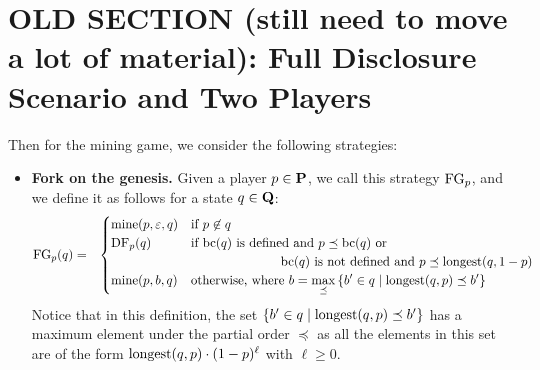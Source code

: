 
\section{OLD SECTION (still need to move a lot of material): Full Disclosure Scenario and Two Players}
\label{sec-fd&2p}


Then for the mining game, we consider the following strategies:
\begin{itemize}

\item {\bf Fork on the genesis.} Given a player $p \in \mathbf{P}$, we call this strategy $\text{\rm FG}_p$, and we define it as follows for a state $q \in \mathbf{Q}$:
\begin{eqnarray*}
\text{\rm FG}_p(q) & = &
\begin{cases}
\text{\rm mine}(p,\varepsilon,q) & \text{if } p \not\in q\\
\text{\rm DF}_p(q) & \text{if } \text{bc}(q) \text{ is defined and } p \preceq \text{bc}(q) \text{ or}\\
& \hspace{70pt} \text{bc}(q) \text{ is not defined and } p \preceq {\text{\rm longest}}(q,1-p)\\
\text{\rm mine}(p,b,q) &  \text{otherwise, where } {\displaystyle b = \max_{\preceq} \, \{ b' \in q \mid {\text{\rm longest}}(q,p) \preceq b'\}}
\end{cases}
\end{eqnarray*}
Notice that in this definition, the set $\{ b' \in q \mid {\text{\rm longest}}(q,p) \preceq b'\}$ has a maximum element under the partial order $\preceq$ as all the elements in this set are of the form ${\text{\rm longest}}(q,p) \cdot (1-p)^\ell$ with $\ell \geq 0$.


\end{itemize}
